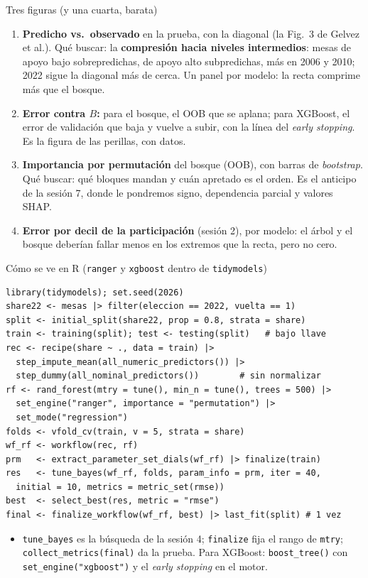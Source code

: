 \documentclass{beamer}
\newcommand{\1}{\mathbb{I}}
\begin{document}
\begin{frame}{Tres figuras (y una cuarta, barata)}
\small
\begin{enumerate}\itemsep4pt
  \item \textbf{Predicho vs.\ observado} en la prueba, con la diagonal (la Fig.\ 3 de Gelvez et al.). Qué buscar: la \textbf{compresión hacia niveles intermedios}: mesas de apoyo bajo sobrepredichas, de apoyo alto subpredichas, más en 2006 y 2010; 2022 sigue la diagonal más de cerca. Un panel por modelo: la recta comprime más que el bosque. \pause
  \item \textbf{Error contra $B$:} para el bosque, el OOB que se aplana; para XGBoost, el error de validación que baja y vuelve a subir, con la línea del \emph{early stopping}. Es la figura de las perillas, con datos. \pause
  \item \textbf{Importancia por permutación} del bosque (OOB), con barras de \emph{bootstrap}. Qué buscar: qué bloques mandan y cuán apretado es el orden. Es el anticipo de la sesión 7, donde le pondremos signo, dependencia parcial y valores SHAP. \pause
  \item \textbf{Error por decil de la participación} (sesión 2), por modelo: el árbol y el bosque deberían fallar menos en los extremos que la recta, pero no cero.
\end{enumerate}
\end{frame}

\begin{frame}[fragile]{Cómo se ve en R (\texttt{ranger} y \texttt{xgboost} dentro de \texttt{tidymodels})}
\scriptsize
\begin{verbatim}
library(tidymodels); set.seed(2026)
share22 <- mesas |> filter(eleccion == 2022, vuelta == 1)
split <- initial_split(share22, prop = 0.8, strata = share)
train <- training(split); test <- testing(split)   # bajo llave
rec <- recipe(share ~ ., data = train) |>
  step_impute_mean(all_numeric_predictors()) |>
  step_dummy(all_nominal_predictors())        # sin normalizar
rf <- rand_forest(mtry = tune(), min_n = tune(), trees = 500) |>
  set_engine("ranger", importance = "permutation") |>
  set_mode("regression")
folds <- vfold_cv(train, v = 5, strata = share)
wf_rf <- workflow(rec, rf)
prm   <- extract_parameter_set_dials(wf_rf) |> finalize(train)
res   <- tune_bayes(wf_rf, folds, param_info = prm, iter = 40,
  initial = 10, metrics = metric_set(rmse))
best  <- select_best(res, metric = "rmse")
final <- finalize_workflow(wf_rf, best) |> last_fit(split) # 1 vez
\end{verbatim}
\normalsize
\small
\begin{itemize}\itemsep2pt
  \item \texttt{tune\_bayes} es la búsqueda de la sesión 4; \texttt{finalize} fija el rango de \texttt{mtry}; \texttt{collect\_metrics(final)} da la prueba. Para XGBoost: \texttt{boost\_tree()} con \texttt{set\_engine("xgboost")} y el \emph{early stopping} en el motor.
\end{itemize}
\end{frame}
\end{document}
